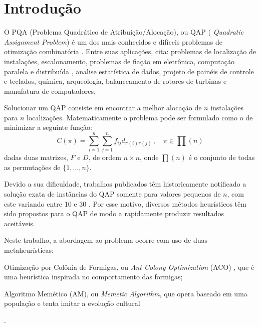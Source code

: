 \section{Introdução}

O PQA (Problema Quadrático de Atribuição/Alocação), ou QAP (
\textit{Quadratic Assignment Problem}) \cite{qap-origin} é um dos
mais conhecidos e difíceis problemas de otimização combinatória
\cite{Maniezzo98exactand}. Entre suas aplicações, \cite{QAPBOOK} cita:
problemas de localização de instalações, escalonamento, problemas de
fiação em eletrônica, computação paralela e distribuída \cite{22},
analise estatística de dados, projeto de painéis de controle e teclados,
química, arqueologia, balanceamento de rotores de turbinas e
manufatura de computadores.


Solucionar um QAP consiste em encontrar a melhor alocação de $n$
instalações para $n$ localizações. Matematicamente o problema pode ser
formulado como o de minimizar a seguinte função:
\begin{equation}\label{calc-custo}
C(\pi) = \sum_{i = 1}^{n} \sum_{j = 1}^{n} f_{ij} d_{\pi(i)
   \pi(j)} \, , \quad \pi \in \prod(n)
\end{equation}
dadas duas matrizes, $F$ e $D$, de ordem $n \times n$, onde $\prod(n)$ é o
conjunto de todas as permutações de $\{1, \ldots , n\}$.

Devido a sua dificuldade, trabalhos publicados têm historicamente
notificado a solução exata de instâncias do QAP somente para valores
pequenos de $n$, com este variando entre
10 \cite{qap-origin} e 30 \cite{stutzle04}.
Por esse motivo, diversos métodos heurísticos têm sido propostos
para o QAP de modo a rapidamente produzir resultados aceitáveis.

Neste trabalho, a abordagem ao problema ocorre com uso de duas
metaheurísticas: \begin{inparaenum}[(1)] \item Otimização por Colônia
  de Formigas, ou {\it Ant Colony Optimization} (ACO) \cite{ACO}, que é
uma heurística inspirada no comportamento das formigas;
\item Algoritmo Memético (AM), ou \textit{Memetic Algorithm}\cite{moscato1},
que opera baseado em uma população e tenta imitar a evolução
cultural\end{inparaenum}.

